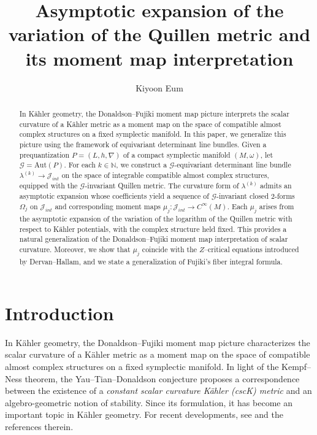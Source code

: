 \documentclass[12pt,reqno,a4paper]{amsart}
\title[Quillen metric and moment map]{Asymptotic expansion of the variation of the Quillen metric and its moment map interpretation}
\author{Kiyoon Eum}
\numberwithin{equation}{section}
\theoremstyle{definition}
\theoremstyle{remark}
\begin{document}
\begin{abstract}
In K\"ahler geometry, the Donaldson--Fujiki moment map picture interprets the scalar curvature of a K\"ahler metric as a moment map on the space of compatible almost complex structures on a fixed symplectic manifold. In this paper, we generalize this picture using the framework of equivariant determinant line bundles. Given a prequantization $P=(L,h,\nabla)$ of a compact symplectic manifold $(M,\omega)$, let $\mathcal{G}=\mathrm{Aut}(P)$. For each $k\in\mathbb{N}$, we construct a $\mathcal{G}$-equivariant determinant line bundle $\lambda^{(k)}\rightarrow\mathcal{J}_{int}$ on the space of integrable compatible almost complex structures, equipped with the $\mathcal{G}$-invariant Quillen metric. The curvature form of $\lambda^{(k)}$ admits an asymptotic expansion whose coefficients yield a sequence of $\mathcal{G}$-invariant closed $2$-forms $\Omega_j$ on $\mathcal{J}_{int}$ and corresponding moment maps $\mu_j:\mathcal{J}_{int}\rightarrow C^\infty(M)$. Each $\mu_j$ arises from the asymptotic expansion of the variation of the logarithm of the Quillen metric with respect to K\"ahler potentials, with the complex structure held fixed. This provides a natural generalization of the Donaldson--Fujiki moment map interpretation of scalar curvature. Moreover, we show that $\mu_j$ coincide with the $Z$--critical equations introduced by Dervan--Hallam, and we state a generalization of Fujiki's fiber integral formula.
\end{abstract}

\maketitle

\thispagestyle{empty}
\tableofcontents


\section{Introduction}

In K\"ahler geometry, the Donaldson--Fujiki moment map picture \cite{donaldson1997remarks,fujiki1992moduli} characterizes the scalar curvature of a K\"ahler metric as a moment map on the space of compatible almost complex structures on a fixed symplectic manifold. In light of the Kempf--Ness theorem, the Yau--Tian--Donaldson conjecture proposes a correspondence between the existence of a \textit{constant scalar curvature K\"ahler (cscK) metric} and an algebro-geometric notion of stability. Since its formulation, it has become an important topic in K\"ahler geometry. For recent developments, see \cite{dervan2025stability} and the references therein.
\end{document}
